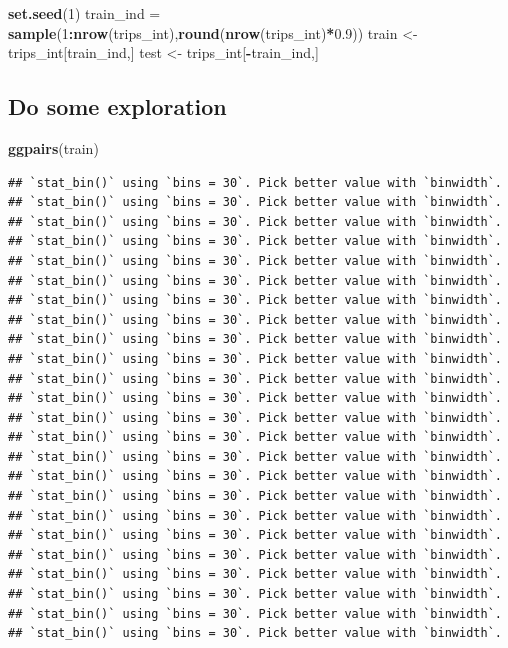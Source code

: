 \documentclass[
]{article}
\newenvironment{Shaded}{\begin{snugshade}}{\end{snugshade}}
\newcommand{\DecValTok}[1]{\textcolor[rgb]{0.00,0.00,0.81}{#1}}
\newcommand{\FloatTok}[1]{\textcolor[rgb]{0.00,0.00,0.81}{#1}}
\newcommand{\FunctionTok}[1]{\textcolor[rgb]{0.13,0.29,0.53}{\textbf{#1}}}
\newcommand{\NormalTok}[1]{#1}
\newcommand{\OtherTok}[1]{\textcolor[rgb]{0.56,0.35,0.01}{#1}}
\newcommand{\SpecialCharTok}[1]{\textcolor[rgb]{0.81,0.36,0.00}{\textbf{#1}}}
\begin{document}
\begin{Shaded}
\begin{Highlighting}[]
\FunctionTok{set.seed}\NormalTok{(}\DecValTok{1}\NormalTok{)}
\NormalTok{train\_ind }\OtherTok{=} \FunctionTok{sample}\NormalTok{(}\DecValTok{1}\SpecialCharTok{:}\FunctionTok{nrow}\NormalTok{(trips\_int),}\FunctionTok{round}\NormalTok{(}\FunctionTok{nrow}\NormalTok{(trips\_int)}\SpecialCharTok{*}\FloatTok{0.9}\NormalTok{))}
\NormalTok{train }\OtherTok{\textless{}{-}}\NormalTok{ trips\_int[train\_ind,]}
\NormalTok{test }\OtherTok{\textless{}{-}}\NormalTok{ trips\_int[}\SpecialCharTok{{-}}\NormalTok{train\_ind,]}
\end{Highlighting}
\end{Shaded}

\subsection{Do some exploration}\label{do-some-exploration}

\begin{Shaded}
\begin{Highlighting}[]
\FunctionTok{ggpairs}\NormalTok{(train)}
\end{Highlighting}
\end{Shaded}

\begin{verbatim}
## `stat_bin()` using `bins = 30`. Pick better value with `binwidth`.
## `stat_bin()` using `bins = 30`. Pick better value with `binwidth`.
## `stat_bin()` using `bins = 30`. Pick better value with `binwidth`.
## `stat_bin()` using `bins = 30`. Pick better value with `binwidth`.
## `stat_bin()` using `bins = 30`. Pick better value with `binwidth`.
## `stat_bin()` using `bins = 30`. Pick better value with `binwidth`.
## `stat_bin()` using `bins = 30`. Pick better value with `binwidth`.
## `stat_bin()` using `bins = 30`. Pick better value with `binwidth`.
## `stat_bin()` using `bins = 30`. Pick better value with `binwidth`.
## `stat_bin()` using `bins = 30`. Pick better value with `binwidth`.
## `stat_bin()` using `bins = 30`. Pick better value with `binwidth`.
## `stat_bin()` using `bins = 30`. Pick better value with `binwidth`.
## `stat_bin()` using `bins = 30`. Pick better value with `binwidth`.
## `stat_bin()` using `bins = 30`. Pick better value with `binwidth`.
## `stat_bin()` using `bins = 30`. Pick better value with `binwidth`.
## `stat_bin()` using `bins = 30`. Pick better value with `binwidth`.
## `stat_bin()` using `bins = 30`. Pick better value with `binwidth`.
## `stat_bin()` using `bins = 30`. Pick better value with `binwidth`.
## `stat_bin()` using `bins = 30`. Pick better value with `binwidth`.
## `stat_bin()` using `bins = 30`. Pick better value with `binwidth`.
## `stat_bin()` using `bins = 30`. Pick better value with `binwidth`.
## `stat_bin()` using `bins = 30`. Pick better value with `binwidth`.
## `stat_bin()` using `bins = 30`. Pick better value with `binwidth`.
## `stat_bin()` using `bins = 30`. Pick better value with `binwidth`.
\end{verbatim}
\end{document}
